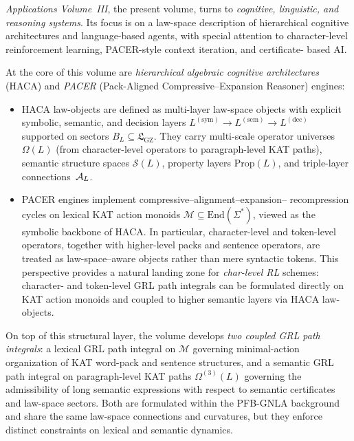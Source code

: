 \documentclass[11pt]{book}
\theoremstyle{plain}
\theoremstyle{definition}
\theoremstyle{remark}
\newcommand{\GZLS}{\ensuremath{\mathfrak{L}_{\mathrm{GZ}}}}       \newcommand{\GZLT}{\ensuremath{M_{!w}}}                           \newcommand{\GZLOC}{\ensuremath{A_M}}                             \newcommand{\GZLC}{\ensuremath{\omega_{\mathrm{law}}}}            \newcommand{\GZLCurv}{\ensuremath{\mathcal{F}_{\mathrm{law}}}}
\begin{document}
\emph{Applications Volume~III}, the present volume, turns to
\emph{cognitive, linguistic, and reasoning systems}. Its focus is on a
law-space description of hierarchical cognitive architectures and
language-based agents, with special attention to character-level
reinforcement learning, PACER-style context iteration, and certificate-
based AI.

At the core of this volume are \emph{hierarchical algebraic cognitive
architectures} (HACA) and \emph{PACER} (Pack-Aligned
Compressive–Expansion Reasoner) engines:
\begin{itemize}
  \item HACA law-objects are defined as multi-layer law-space objects
        with explicit symbolic, semantic, and decision layers
        $L^{(\mathrm{sym})}\to L^{(\mathrm{sem})}\to L^{(\mathrm{dec})}$
        supported on sectors $B_L\subseteq\GZLS$. They carry multi-scale
        operator universes $\Omega(L)$ (from character-level operators
        to paragraph-level KAT paths), semantic structure spaces
        $\mathcal{S}(L)$, property layers $\mathrm{Prop}(L)$, and
        triple-layer connections~$\mathcal{A}_L$.
  \item PACER engines implement compressive–alignment–expansion–
        recompression cycles on lexical KAT action monoids
        $\mathcal{M}\subseteq\mathrm{End}(\Sigma^*)$, viewed as the
        symbolic backbone of HACA. In particular, character-level and
        token-level operators, together with higher-level packs and
        sentence operators, are treated as law-space–aware objects rather
        than mere syntactic tokens. This perspective provides a natural
        landing zone for \emph{char-level RL} schemes: character- and
        token-level GRL path integrals can be formulated directly on
        KAT action monoids and coupled to higher semantic layers via
        HACA law-objects.
\end{itemize}

On top of this structural layer, the volume develops \emph{two coupled
GRL path integrals}: a lexical GRL path integral on $\mathcal{M}$
governing minimal-action organization of KAT word-pack and sentence
structures, and a semantic GRL path integral on paragraph-level KAT
paths $\Omega^{(3)}(L)$ governing the admissibility of long semantic
expressions with respect to semantic certificates and law-space sectors.
Both are formulated within the PFB-GNLA background and share the same
law-space connections and curvatures, but they enforce distinct
constraints on lexical and semantic dynamics.
\end{document}
